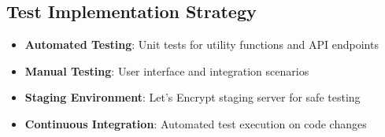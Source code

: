\subsection{Test Implementation Strategy}

\begin{itemize}
    \item \textbf{Automated Testing}: Unit tests for utility functions and API endpoints
    \item \textbf{Manual Testing}: User interface and integration scenarios
    \item \textbf{Staging Environment}: Let's Encrypt staging server for safe testing
    \item \textbf{Continuous Integration}: Automated test execution on code changes
\end{itemize}